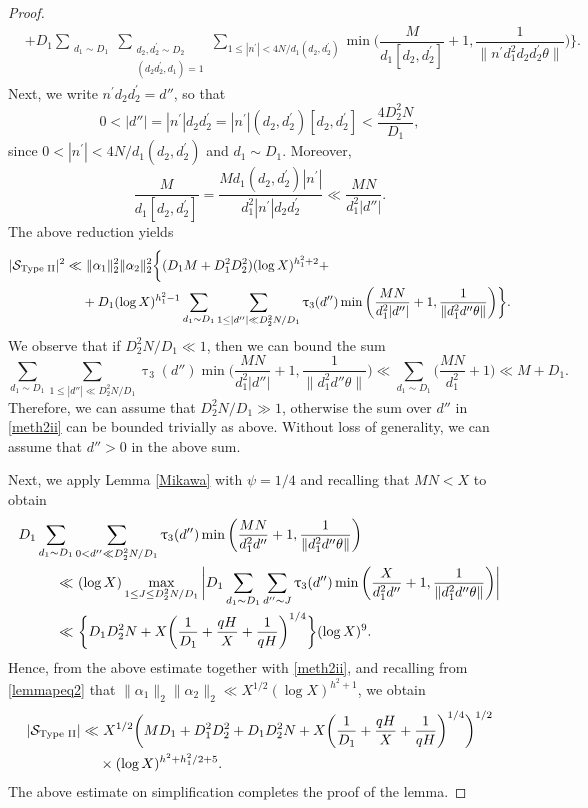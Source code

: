 \documentclass[12pt]{amsart}
\numberwithin{equation}{section}
\theoremstyle{remark}
\theoremstyle{definition}
\begin{document}
\begin{proof}
\begin{align}
\label{meth2iii}  & + D_1\sum_{\substack{d_1\sim D_1}}\sum_{\substack{d_2, d_2^\prime \sim D_2\\(d_2d_2^\prime,d_1)=1}}\sum_{1\leq |n^\prime| < 4N/d_1(d_2, d_2^\prime)}\min\bigg(\dfrac{M}{d_1[d_2, d_2^\prime]} + 1, \dfrac{1}{\lVert n^\prime d_1^2d_2d_2^\prime\theta\rVert}\bigg)\bigg\}.
 \end{align}
 Next, we write $n^\prime d_2d_2^\prime =d''$, so that 
\[0<|d''|=|n^\prime| d_2d_2^\prime = |n^\prime| (d_2,d_2^\prime)[d_2, d_2^\prime] < \dfrac{4D_2^2N}{D_1},\] 
since $0<|n^\prime| < 4N/d_1(d_2, d_2^\prime)$ and $d_1\sim D_1$. Moreover,
\[\dfrac{M}{d_1[d_2, d_2^\prime]} = \dfrac{Md_1(d_2, d_2^\prime)|n^\prime|}{d_1^2 |n^\prime| d_2d_2^\prime} \ll  \dfrac{MN}{d_1^2|d''|}.\]
 The above reduction yields
 \begin{align}
\notag \lvert \mathcal{S}_{\textup{Type II}}\rvert^2\ll &~\|\alpha_1\|_2^2\|\alpha_2\|_2^2\bigg\{(D_1M+D_1^2D_2^2)(\log X)^{h_1^2+2}+ \\
\label{meth2ii} & + D_1(\log X)^{h_1^2-1}\sum_{d_1\sim D_1}\sum_{1\leq |d''|\ll D_2^2N/D_1}\uptau_3(d'')\min\bigg(\dfrac{MN}{d_1^2|d''|} + 1,\dfrac{1}{\lVert d_1^2d''\theta\rVert}\bigg)\bigg\}.
 \end{align}
We observe that if $D_2^2N/D_1\ll 1$, then we can bound the sum 
\[\sum_{d_1\sim D_1}\sum_{1\leq |d''|\ll D_2^2N/D_1}\uptau_3(d'')\min\bigg(\dfrac{MN}{d_1^2|d''|} + 1,\dfrac{1}{\lVert d_1^2d''\theta\rVert}\bigg) \ll \sum_{d_1\sim D_1}\bigg(\dfrac{MN}{d_1^2} + 1\bigg) \ll M + D_1. \]
Therefore, we can assume that $D_2^2N/D_1\gg1$, otherwise the sum over $d''$  in \eqref{meth2ii} can be bounded trivially as above. Without loss of generality, we can assume that $d''>0$ in the above sum.

Next, we apply Lemma \ref{Mikawa} with $\psi=1/4$ and recalling that $MN<X$ to obtain
\begin{align}
\notag D_1\sum_{d_1\sim D_1}&\sum_{0<d''\ll D_2^2N/D_1}\uptau_3(d'')\min\bigg(\dfrac{MN}{d_1^2d''} + 1,\dfrac{1}{\lVert d_1^2d''\theta\rVert}\bigg)\\
\notag \ll &~(\log X)\max_{1\leq J\leq D_2^2N/D_1}\bigg|D_1\sum_{d_1\sim D_1}\sum_{d''\sim J}\uptau_3(d'')\min\bigg(\dfrac{X}{d_1^2d''} + 1,\dfrac{1}{\lVert d_1^2d''\theta\rVert}\bigg)\bigg|\\
\notag \ll &~\bigg\{D_1D_2^2N + X\bigg(\dfrac{1}{D_1} + \dfrac{qH}{X} + \dfrac{1}{qH}\bigg)^{1/4}\bigg\}(\log X)^9.
\end{align}
Hence, from the above estimate together with \eqref{meth2ii}, and recalling from \eqref{lemmapeq2} that $\lVert {\alpha}_1\rVert_2\lVert {\alpha}_2 \rVert_2 \ll X^{1/2}(\log X)^{h^2+1}$, we obtain
\begin{align}
\notag \lvert \mathcal{S}_{\textup{Type II}}\rvert \ll &~ X^{1/2}\bigg(MD_1 + D_1^2D_2^2 + D_1D_2^2N+X\bigg(\dfrac{1}{D_1} + \dfrac{qH}{X} + \dfrac{1}{qH}\bigg)^{1/4}\bigg)^{1/2}\\
\notag &\times (\log X)^{h^2+h_1^2/2+5}.
\end{align}
The above estimate on simplification completes the proof of the lemma.
\end{proof}
\end{document}
